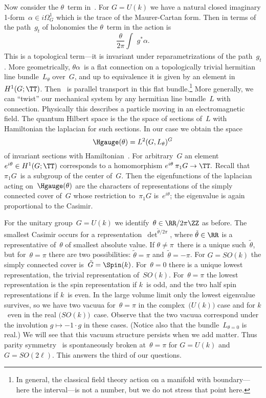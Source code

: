 Now consider the $\theta $~term in~.  For $G=U(k)$ we have a
natural closed imaginary 1-form~$\alpha \in i\Omega ^1_{G}$ which is the
trace of the Maurer-Cartan form.  Then in terms of the path~$g_t$ of
holonomies the $\theta $~term in the action is 
  $$ \frac{\theta }{2\pi }\int_{}\;g^*\alpha . \tag{25} $$
This is a topological term---it is invariant under reparametrizations of the
path~$g_t$.  More geometrically, $\theta \alpha $~is a flat connection on a
topologically trivial hermitian line bundle~$L_\theta $ over~$G$, and up to
equivalence it is given by an element in~$H^1(G;\TT)$.  Then ~is
parallel transport in this flat bundle.\footnote{In general, the classical
field theory action on a manifold with boundary---here the interval---is not
a number, but we do not stress that point here.}  More generally, we can
``twist'' our mechanical system by any hermitian line bundle~$L$ with
connection.  Physically this describes a particle moving in an
electromagnetic field.  The quantum Hilbert space is the the space of
sections of~$L$ with Hamiltonian the laplacian for such sections.  In our
case we obtain the space
  $$ \Hgauge(\theta ) = L^2(G,L_\theta )^G  $$
of invariant sections with Hamiltonian~.  For arbitrary~$G$ an
element $e^{i\theta} \in H^1(G;\TT)$ corresponds to a homomorphism
$e^{i\theta }\:\pi _1G\to\TT.$  Recall that $\pi _1G$~is a subgroup of the
center of~$G$.  Then the eigenfunctions of the laplacian acting
on~$\Hgauge(\theta )$ are the characters of representations of the simply
connected cover of~$G$ whose restriction to~$\pi _1G$ is~$e^{i\theta }$; the
eigenvalue is again proportional to the Casimir.
 
For the unitary group~$G=U(k)$ we identify~$\theta \in \RR/2\pi \ZZ$ as
before.  The smallest Casimir occurs for a
representation~$\det^{\tilde{\theta}/2\pi }$, where $\tilde{\theta }\in \RR$
is a representative of~$\theta $ of smallest absolute value.  If $\theta
\not= \pi $~there is a unique such~$\tilde{\theta }$, but for~$\theta =\pi $
there are two possibilities: $\tilde{\theta }=\pi $ and~$\tilde{\theta }=-\pi
$.  For $G=SO(k)$ the simply connected cover is~$\tilde{G}=\Spin(k)$.
For~$\theta =0$ there is a unique lowest representation, the trivial
representation of~$SO(k)$.  For~$\theta =\pi$ the lowest representation is
the spin representation if $k$~is odd, and the two half spin representations
if $k$~is even.  In the large volume limit only the lowest eigenvalue
survives, so we have two vacuua for~$\theta =\pi $ in the complex~$\bigl(U(k)
\bigr)$ case and for $k$~even in the real $\bigl(SO(k) \bigr)$~case.  Observe
that the two vacuua correspond under the involution $g\mapsto -1\cdot g$ in
these cases.  (Notice also that the bundle~$L_{\theta =0}$ is real.)  We will
see that this vacuum structure persists when we add matter.  Thus parity
symmetry~ is spontaneously broken at~$\theta =\pi $ for $G=U(k)$
and~$G=SO(2\ell )$.  This answers the third of our questions.
 
